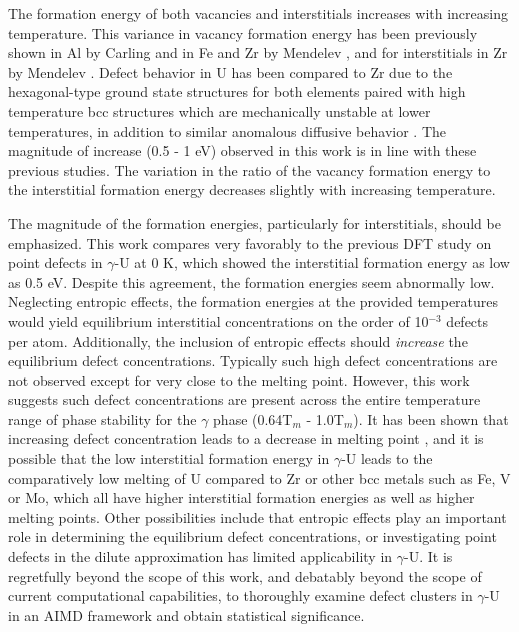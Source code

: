 \documentclass[review]{elsarticle}
\begin{document}
The formation energy of both vacancies and interstitials increases with increasing temperature. This variance in vacancy formation energy has been previously shown in Al by Carling \cite{carling2003} and in Fe and Zr by Mendelev \cite{mendelev2009, mendelev2010}, and for interstitials in Zr by Mendelev \cite{mendelev2010}. Defect behavior in U has been compared to Zr due to the hexagonal-type ground state structures for both elements paired with high temperature bcc structures which are mechanically unstable at lower temperatures, in addition to similar anomalous diffusive behavior \cite{matter1980,kidson1961}. The magnitude of increase (0.5 - 1 eV) observed in this work is in line with these previous studies. The variation in the ratio of the vacancy formation energy to the interstitial formation energy decreases slightly with increasing temperature.

The magnitude of the formation energies, particularly for interstitials, should be emphasized. This work compares very favorably to the previous DFT study on point defects in $\gamma$-U at 0 K\cite{beeler2010}, which showed the interstitial formation energy as low as 0.5 eV. Despite this agreement, the formation energies seem abnormally low.  Neglecting entropic effects, the formation energies at the provided temperatures would yield equilibrium interstitial concentrations on the order of 10$^{-3}$ defects per atom. Additionally, the inclusion of entropic effects should \textit{increase} the equilibrium defect concentrations. Typically such high defect concentrations are not observed except for very close to the melting point. However, this work suggests such defect concentrations are present across the entire temperature range of phase stability for the $\gamma$ phase (0.64T$_m$ - 1.0T$_m$). It has been shown that increasing defect concentration leads to a decrease in melting point \cite{sorkin2003}, and it is possible that the low interstitial formation energy in $\gamma$-U leads to the comparatively low melting of U compared to Zr or other bcc metals \cite{williams1990} such as Fe, V or Mo, which all have higher interstitial formation energies \cite{mendelev2010, mendelev2009, nguyen2006} as well as higher melting points. Other possibilities include that entropic effects play an important role in determining the equilibrium defect concentrations, or investigating point defects in the dilute approximation has limited applicability in $\gamma$-U. It is regretfully beyond the scope of this work, and debatably beyond the scope of current computational capabilities, to thoroughly examine defect clusters in $\gamma$-U in an AIMD framework and obtain statistical significance. 
\end{document}
